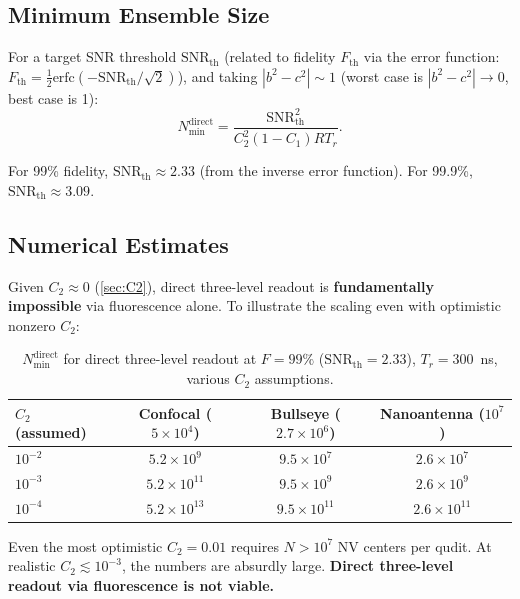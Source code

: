 \documentclass[11pt,letterpaper]{article}
\begin{document}
\subsection{Minimum Ensemble Size}

For a target SNR threshold $\text{SNR}_{\text{th}}$ (related to fidelity
$F_{\text{th}}$ via the error function: $F_{\text{th}} = \frac{1}{2}\text{erfc}(-\text{SNR}_{\text{th}}/\sqrt{2})$), and taking $|b^2 - c^2| \sim 1$
(worst case is $|b^2 - c^2| \to 0$, best case is 1):
\begin{equation}
  \boxed{N_{\min}^{\text{direct}} = \frac{\text{SNR}_{\text{th}}^2}{C_2^2 (1-C_1) R T_r}.}
  \label{eq:Nmin_direct}
\end{equation}

For 99\% fidelity, $\text{SNR}_{\text{th}} \approx 2.33$ (from the inverse
error function).  For 99.9\%, $\text{SNR}_{\text{th}} \approx 3.09$.

\subsection{Numerical Estimates}

Given $C_2 \approx 0$ (\cref{sec:C2}), direct three-level readout is
\textbf{fundamentally impossible} via fluorescence alone.  To illustrate the
scaling even with optimistic nonzero $C_2$:

\begin{table}[h]
\centering
\caption{$N_{\min}^{\text{direct}}$ for direct three-level readout at $F = 99\%$
($\text{SNR}_{\text{th}} = 2.33$), $T_r = 300$~ns, various $C_2$ assumptions.}
\label{tab:Nmin_direct}
\begin{tabular}{lccc}
\toprule
$C_2$ (assumed) & Confocal ($5 \times 10^4$) & Bullseye ($2.7 \times 10^6$) & Nanoantenna ($10^7$) \\
\midrule
$10^{-2}$ & $5.2 \times 10^9$ & $9.5 \times 10^7$ & $2.6 \times 10^7$ \\
$10^{-3}$ & $5.2 \times 10^{11}$ & $9.5 \times 10^9$ & $2.6 \times 10^9$ \\
$10^{-4}$ & $5.2 \times 10^{13}$ & $9.5 \times 10^{11}$ & $2.6 \times 10^{11}$ \\
\bottomrule
\end{tabular}
\end{table}

\noindent
Even the most optimistic $C_2 = 0.01$ requires $N > 10^7$ NV centers per
qudit.  At realistic $C_2 \lesssim 10^{-3}$, the numbers are absurdly large.
\textbf{Direct three-level readout via fluorescence is not viable.}
\end{document}
